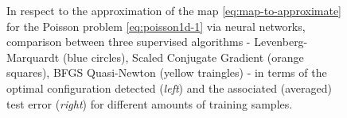 \documentclass[12pt, a4paper, twoside, openright, notitlepage]{report}
\numberwithin{equation}{chapter}
\theoremstyle{theorem}
\theoremstyle{definition}
\theoremstyle{remark}
\theoremstyle{proposition}
\numberwithin{figure}{chapter}
\begin{document}
\begin{figure}[t!]
			
			\caption{In respect to the approximation of the map \eqref{eq:map-to-approximate} for the Poisson problem \eqref{eq:poisson1d-1} via neural networks, comparison between three supervised algorithms - Levenberg-Marquardt (blue circles), Scaled Conjugate Gradient (orange squares), BFGS Quasi-Newton (yellow traingles) - in terms of the optimal configuration detected (\emph{left}) and the associated (averaged) test error (\emph{right}) for different amounts of training samples.}
			\label{fig:poisson1d-1-fig2}
		

\end{figure}
\end{document}
